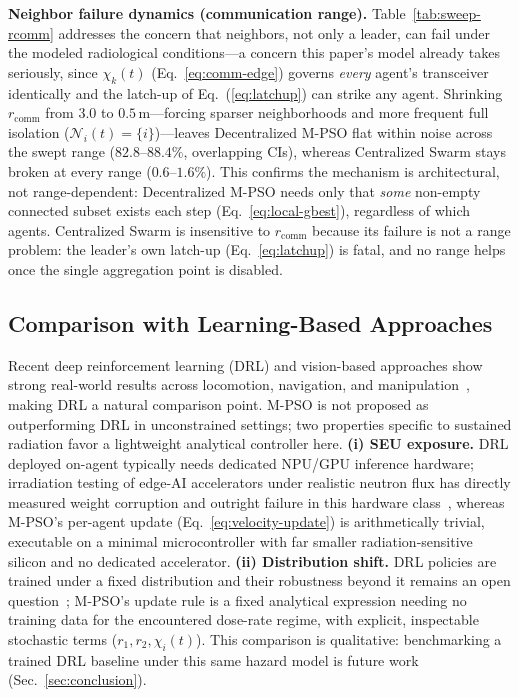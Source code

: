 \documentclass[conference]{IEEEtran}
\begin{document}
\textbf{Neighbor failure dynamics (communication range).} Table~\ref{tab:sweep-rcomm} addresses the concern that neighbors, not only a leader, can fail under the modeled radiological conditions---a concern this paper's model already takes seriously, since $\chi_k(t)$ (Eq.~\ref{eq:comm-edge}) governs \emph{every} agent's transceiver identically and the latch-up of Eq.~(\ref{eq:latchup}) can strike any agent. Shrinking $r_{\text{comm}}$ from $3.0$ to $0.5\,\text{m}$---forcing sparser neighborhoods and more frequent full isolation ($\mathcal{N}_i(t)=\{i\}$)---leaves Decentralized M-PSO flat within noise across the swept range ($82.8$--$88.4\%$, overlapping CIs), whereas Centralized Swarm stays broken at every range ($0.6$--$1.6\%$). This confirms the mechanism is architectural, not range-dependent: Decentralized M-PSO needs only that \emph{some} non-empty connected subset exists each step (Eq.~\ref{eq:local-gbest}), regardless of which agents. Centralized Swarm is insensitive to $r_{\text{comm}}$ because its failure is not a range problem: the leader's own latch-up (Eq.~\ref{eq:latchup}) is fatal, and no range helps once the single aggregation point is disabled.

\subsection{Comparison with Learning-Based Approaches}
\label{sec:ai-comparison}

Recent deep reinforcement learning (DRL) and vision-based approaches show strong real-world results across locomotion, navigation, and manipulation~\cite{tang_drl_survey_2025}, making DRL a natural comparison point. M-PSO is not proposed as outperforming DRL in unconstrained settings; two properties specific to sustained radiation favor a lightweight analytical controller here. \textbf{(i) SEU exposure.} DRL deployed on-agent typically needs dedicated NPU/GPU inference hardware; irradiation testing of edge-AI accelerators under realistic neutron flux has directly measured weight corruption and outright failure in this hardware class~\cite{imianosky_seu_2024}, whereas M-PSO's per-agent update (Eq.~\ref{eq:velocity-update}) is arithmetically trivial, executable on a minimal microcontroller with far smaller radiation-sensitive silicon and no dedicated accelerator. \textbf{(ii) Distribution shift.} DRL policies are trained under a fixed distribution and their robustness beyond it remains an open question~\cite{tang_drl_survey_2025}; M-PSO's update rule is a fixed analytical expression needing no training data for the encountered dose-rate regime, with explicit, inspectable stochastic terms ($r_1,r_2,\chi_i(t)$). This comparison is qualitative: benchmarking a trained DRL baseline under this same hazard model is future work (Sec.~\ref{sec:conclusion}).
\end{document}
